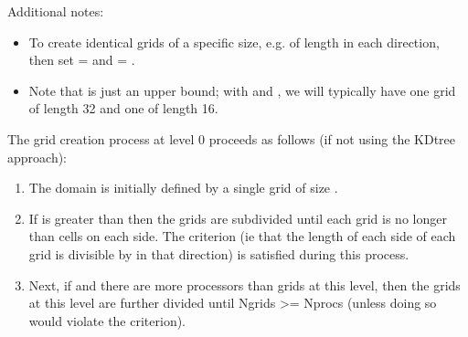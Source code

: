 \documentclass[letterpaper,10pt,english]{sphinxmanual}
\begin{document}
\sphinxAtStartPar
Additional notes:
\begin{itemize}
\item {} 
\sphinxAtStartPar
To create identical grids of a specific size, e.g. of length  in each direction,
then set  =  and  = .

\item {} 
\sphinxAtStartPar
Note that  is just an upper bound; with 
and , we will typically have one grid of length 32 and one of length 16.

\end{itemize}

\sphinxAtStartPar
The grid creation process at level 0 proceeds as follows (if not using the KD\sphinxhyphen{}tree approach):
\begin{enumerate}
%
\item {} 
\sphinxAtStartPar
The domain is initially defined by a single grid of size .

\item {} 
\sphinxAtStartPar
If  is greater than  then the grids are subdivided until
each grid is no longer than   cells on each side.  The  criterion
(ie that the length of each side of each grid is divisible by  in that direction)
is satisfied during this process.

\item {} 
\sphinxAtStartPar
Next, if  and there are more processors than grids
at this level, then the grids at this level are further divided until Ngrids \textgreater{}= Nprocs
(unless doing so would violate the  criterion).

\end{enumerate}
\end{document}
